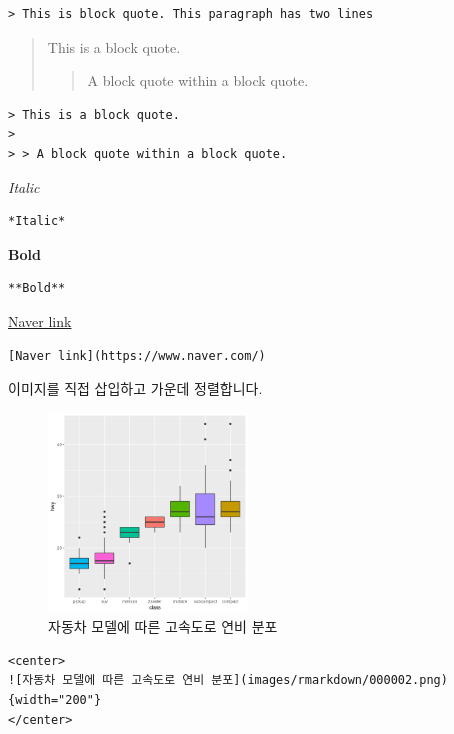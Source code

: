 \documentclass[
  a4paper,
]{book}
\begin{document}
\begin{verbatim}
> This is block quote. This paragraph has two lines
\end{verbatim}

\begin{quote}
This is a block quote.

\begin{quote}
A block quote within a block quote.
\end{quote}
\end{quote}

\begin{verbatim}
> This is a block quote.
>
> > A block quote within a block quote.
\end{verbatim}

\emph{Italic}

\begin{verbatim}
*Italic*
\end{verbatim}

\textbf{Bold}

\begin{verbatim}
**Bold**
\end{verbatim}

\href{https://www.naver.com/}{Naver link}

\begin{verbatim}
[Naver link](https://www.naver.com/)
\end{verbatim}

이미지를 직접 삽입하고 가운데 정렬합니다.

\begin{figure}

{\centering \includegraphics[width=2.08333in,height=\textheight]{images/rmarkdown/000002.png}

}

\caption{자동차 모델에 따른 고속도로 연비 분포}

\end{figure}

\begin{verbatim}
<center>
![자동차 모델에 따른 고속도로 연비 분포](images/rmarkdown/000002.png){width="200"}
</center>
\end{verbatim}
\end{document}
